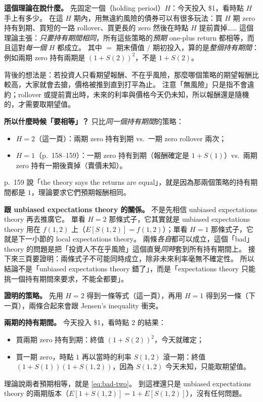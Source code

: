 \suppstart
\begin{remark}
	\textbf{這個理論在說什麼。}
	先固定一個（holding period）$H$：今天投入 \$1，看時點 $H$ 手上有多少。
	在這 $H$ 期內，用無違約風險的債券可以有很多玩法：買 $H$ 期 zero 持有到期、買短的一路 rollover、買更長的 zero 然後在時點 $H$ 提前賣掉……
	這個理論主張：\emph{只要持有期間相同}，所有這些策略的\emph{預期} one-plus return 都相等，而且這對\emph{每一個} $H$ 都成立。
	其中  $=$ 期末價值 $/$ 期初投入，算的是\emph{整個持有期間}：例如兩期 zero 持有兩期是 $(1+S(2))^{2}$，不是 $1+S(2)$。

	背後的想法是：若投資人只看期望報酬、不在乎風險，那麼哪個策略的期望報酬比較高，大家就會去搶，價格被推到直到打平為止。
	注意「無風險」只是指不會違約；rollover 或提前賣出時，未來的利率與價格今天仍未知，所以報酬還是隨機的，才需要取期望值。

	\textbf{所以什麼時候「要相等」？}
	只比\emph{同一個持有期間}的策略：
	\begin{itemize}[nosep]
		\item $H=2$（這一頁）：兩期 zero 持有到期 vs.\ 一期 zero rollover 兩次；
		\item $H=1$（p.~158--159）：一期 zero 持有到期（報酬確定是 $1+S(1)$）vs.\ 兩期 zero 持有一期後賣掉（賣價未知）。
	\end{itemize}
	p.~159 說「the theory says the returns are equal」，就是因為那兩個策略的持有期間都是 $1$，理論要求它們預期報酬相同。

	\textbf{跟 unbiased expectations theory 的關係。}
	不是先相信 unbiased expectations theory 再去推廣它。
	單看 $H=2$ 那條式子，它其實就是 unbiased expectations theory 用在 $f(1,2)$ 上（$E[S(1,2)]=f(1,2)$）；單看 $H=1$ 那條式子，它就是下一小節的 local expectations theory。
	兩條\emph{各自}都可以成立，這個「bad」theory 的問題是把「投資人不在乎風險」這個直覺\emph{同時}套到所有持有期間上。
	接下來三頁要證明：兩條式子不可能同時成立，除非未來利率毫無不確定性。
	所以結論不是「unbiased expectations theory 錯了」，而是「expectations theory 只能挑一個持有期間來要求，不能全都要」。

	\textbf{證明的策略。}
	先用 $H=2$ 得到一條等式（這一頁），再用 $H=1$ 得到另一條（下一頁），兩條合起來會跟 Jensen's inequality 衝突。

	\textbf{兩期的持有期間。}
	今天投入 \$1，看時點 $2$ 的結果：
	\begin{itemize}[nosep]
		\item 買兩期 zero 持有到期：終值 $(1+S(2))^{2}$，今天就確定；
		\item 買一期 zero，時點 $1$ 再以當時的利率 $S(1,2)$ 滾一期：終值 $(1+S(1))(1+S(1,2))$，因為 $S(1,2)$ 今天未知，只能取期望值。
	\end{itemize}
	理論說兩者預期相等，就是 \eqref{eq:bad-two}。
	到這裡還只是 unbiased expectations theory 的兩期版本（$E[1+S(1,2)]=1+E[S(1,2)]$），沒有任何問題。
\end{remark}
\suppend

